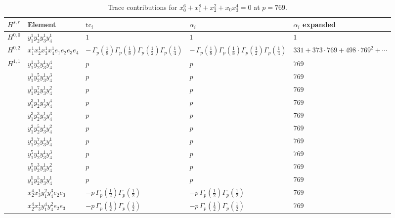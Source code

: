 \documentclass[11pt]{article}
\begin{document}
\begin{table}[ht]
\centering
\caption{Trace contributions for $x_0^{6} + x_1^{8} + x_2^{2} + x_0 x_3^{4} = 0$ at $p=769$.}\label{tab:deformed-65}
\renewcommand{\arraystretch}{1.1}
{\scriptsize
\begin{tabular}{@{}lllll@{}}
\toprule
$H^{s,r}$ & Element & $\mathrm{tc}_i$ & $\alpha_i$ & $\alpha_i$ expanded \\
\midrule
$H^{0,0}$ & $y_{1}^{1} y_{2}^{1} y_{3}^{1} y_{4}^{1}$ & $1$ & $1$ & $1$ \\
\midrule
$H^{0,2}$ & $x_{1}^{1} x_{2}^{1} x_{3}^{1} x_{4}^{1}  e_{1} e_{2} e_{3} e_{4}$ & $- \, \Gamma_p \left( \frac{1}{8} \right) \Gamma_p \left( \frac{1}{8} \right) \Gamma_p \left( \frac{1}{2} \right) \Gamma_p \left( \frac{1}{4} \right)$ & $- \, \Gamma_p \left( \frac{1}{8} \right) \Gamma_p \left( \frac{1}{8} \right) \Gamma_p \left( \frac{1}{2} \right) \Gamma_p \left( \frac{1}{4} \right)$ & $331{+}373{\cdot}769{+}498{\cdot}769^{2}{+}\cdots$ \\
\midrule
$H^{1,1}$ & $y_{1}^{1} y_{2}^{3} y_{3}^{1} y_{4}^{4}$ & $p \,$ & $p \,$ & $769$ \\
 & $y_{1}^{1} y_{2}^{5} y_{3}^{1} y_{4}^{3}$ & $p \,$ & $p \,$ & $769$ \\
 & $y_{1}^{1} y_{2}^{7} y_{3}^{1} y_{4}^{2}$ & $p \,$ & $p \,$ & $769$ \\
 & $y_{1}^{3} y_{2}^{1} y_{3}^{1} y_{4}^{4}$ & $p \,$ & $p \,$ & $769$ \\
 & $y_{1}^{3} y_{2}^{3} y_{3}^{1} y_{4}^{3}$ & $p \,$ & $p \,$ & $769$ \\
 & $y_{1}^{3} y_{2}^{5} y_{3}^{1} y_{4}^{2}$ & $p \,$ & $p \,$ & $769$ \\
 & $y_{1}^{3} y_{2}^{7} y_{3}^{1} y_{4}^{1}$ & $p \,$ & $p \,$ & $769$ \\
 & $y_{1}^{5} y_{2}^{1} y_{3}^{1} y_{4}^{3}$ & $p \,$ & $p \,$ & $769$ \\
 & $y_{1}^{5} y_{2}^{3} y_{3}^{1} y_{4}^{2}$ & $p \,$ & $p \,$ & $769$ \\
 & $y_{1}^{5} y_{2}^{5} y_{3}^{1} y_{4}^{1}$ & $p \,$ & $p \,$ & $769$ \\
 & $x_{2}^{4} x_{3}^{1} y_{1}^{2} y_{4}^{3} e_{2} e_{3}$ & $- p \, \Gamma_p \left( \frac{1}{2} \right) \Gamma_p \left( \frac{1}{2} \right)$ & $- p \, \Gamma_p \left( \frac{1}{2} \right) \Gamma_p \left( \frac{1}{2} \right)$ & $769$ \\
 & $x_{2}^{4} x_{3}^{1} y_{1}^{4} y_{4}^{2} e_{2} e_{3}$ & $- p \, \Gamma_p \left( \frac{1}{2} \right) \Gamma_p \left( \frac{1}{2} \right)$ & $- p \, \Gamma_p \left( \frac{1}{2} \right) \Gamma_p \left( \frac{1}{2} \right)$ & $769$ \\

\end{tabular}}
\end{table}
\end{document}

